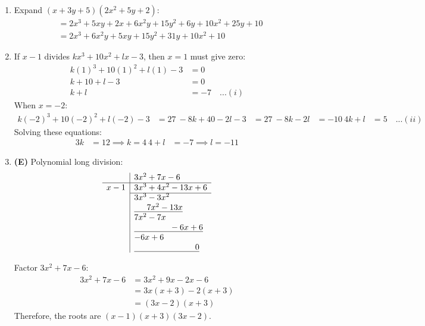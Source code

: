 \begin{multicols}{2}
\begin{enumerate}[label={\textbf{\arabic*.}}]
\item Expand $(x + 3y + 5)(2x^2 + 5y + 2)$:
    \begin{align*}
    &= 2x^3 + 5xy + 2x + 6x^2y + 15y^2 + 6y + 10x^2 + 25y + 10 \\
    &= 2x^3 + 6x^2y + 5xy + 15y^2 + 31y + 10x^2 + 10
    \end{align*}
    \item If $x-1$ divides $kx^3 + 10x^2 + lx - 3$, then $x = 1$ must give zero:
    \begin{align*}
    k(1)^3 + 10(1)^2 + l(1) - 3 &= 0 \\
    k + 10 + l - 3 &= 0 \\
    k + l &= -7 \quad ...(i)
    \end{align*}
    When $x = -2$:
    \begin{align*}
    k(-2)^3 + 10(-2)^2 + l(-2) - 3 &= 27 \
    -8k + 40 - 2l - 3 &= 27 \
    -8k - 2l &= -10 \
    4k + l &= 5 \quad ...(ii)
    \end{align*}
    Solving these equations:
    \begin{align*}
    3k &= 12 \implies k = 4 \
    4 + l &= -7 \implies l = -11
    \end{align*}

    \item \textbf{(E)} Polynomial long division:
        \[
        \begin{array}{r|l}
        & 3x^2 + 7x - 6 \\
        \hline
        x-1 & 3x^3 + 4x^2 - 13x + 6 \\
        \cline{2-2}
        & 3x^3 - 3x^2 \\
        & \underline{\phantom{3x^3} 7x^2 - 13x} \\
        & 7x^2 - 7x \\
        & \underline{\phantom{3x^3 + 7x^2} -6x + 6} \\
        & -6x + 6 \\
        & \underline{\phantom{3x^3 + 7x^2 - 6x +} 0}
        \end{array}
        \]

        Factor \(3x^2 + 7x - 6\):
        \begin{align*}
        3x^2 + 7x - 6 &= 3x^2 + 9x - 2x - 6 \\
        &= 3x(x + 3) - 2(x + 3) \\
        &= (3x - 2)(x + 3)
        \end{align*}
        Therefore, the roots are \((x-1)(x+3)(3x - 2)\).



\end{enumerate}
\end{multicols}
